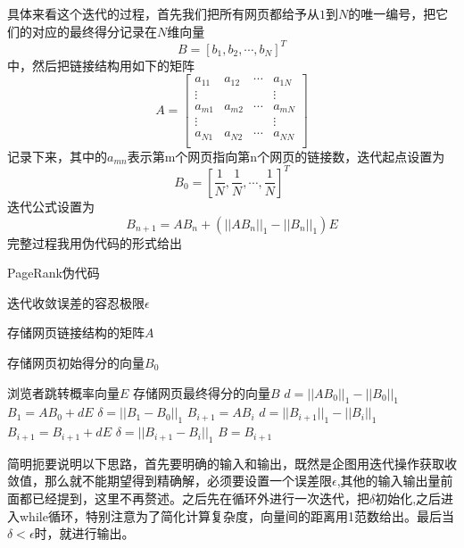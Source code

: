 \documentclass[a4paper, 14pt, twocolumn]{article}
\theoremstyle{definition}
\begin{document}
具体来看这个迭代的过程，首先我们把所有网页都给予从$1$到$N$的唯一编号，把它们的对应的最终得分记录在$N$维向量
\begin{equation*}
B=[b_1,b_2,\cdots,b_N]^T
\end{equation*}
中，然后把链接结构用如下的矩阵
\[A=
\begin{bmatrix}
a_{11} & a_{12} & \cdots & a_{1N} \\
\vdots &        &        & \vdots \\
a_{m1} & a_{m2} & \cdots & a_{mN} \\
\vdots &        &        & \vdots \\
a_{N1} & a_{N2} & \cdots & a_{NN} \\
\end{bmatrix}
\]
记录下来，其中的$a_{mn}$表示第m个网页指向第n个网页的链接数，迭代起点设置为
\begin{equation*}
B_0=[\frac{1}{N},\frac{1}{N},\cdots,\frac{1}{N}]^T
\end{equation*}
迭代公式设置为
\begin{equation*}
B_{n+1}=AB_n+(||AB_n||_1-||B_n||_1)E
\end{equation*}
完整过程我用伪代码的形式给出
\begin{algorithm}[htb]  
\caption{PageRank伪代码}  
\label{alg:PR}  
    \begin{algorithmic}[1]  
     \Require  
          迭代收敛误差的容忍极限$\epsilon$
          
          存储网页链接结构的矩阵$A$
          
          存储网页初始得分的向量$B_0$
          
          浏览者跳转概率向量$E$
     \Ensure  
          存储网页最终得分的向量$B$
     \State $d=||AB_0||_1-||B_0||_1$
     \State $B_1=AB_0+dE$
     \State $\delta = ||B_1-B_0||_1$
     \While{$\delta > \epsilon$}
     \State $B_{i+1} = AB_{i}$
	 \State $d=||B_{i+1}||_1-||B_{i}||_1$     
	 \State $B_{i+1}=B_{i+1}+dE$
	 \State $\delta = ||B_{i+1}-B_i||_1$
     \EndWhile
     \State $B=B_{i+1}$
     \State {} 
     \EndFunction     
     \end{algorithmic}  
\end{algorithm}  

简明扼要说明以下思路，首先要明确的输入和输出，既然是企图用迭代操作获取收敛值，那么就不能期望得到精确解，必须要设置一个误差限$\epsilon$,其他的输入输出量前面都已经提到，这里不再赘述。之后先在循环外进行一次迭代，把$\delta$初始化,之后进入while循环，特别注意为了简化计算复杂度，向量间的距离用1范数给出。最后当$\delta<\epsilon$时，就进行输出。
\end{document}
